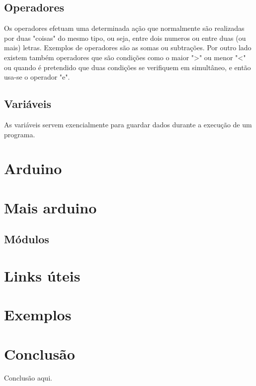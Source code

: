 \documentclass{article}
\begin{document}
\subsection{Operadores}
Os operadores efetuam uma determinada ação que normalmente são realizadas por duas "coisas" do mesmo tipo, ou seja, entre dois numeros ou entre duas (ou mais) letras. Exemplos de operadores são as somas ou subtrações. Por outro lado existem também operadores que são condições como o maior ">" ou menor "<" ou quando é pretendido que duas condições se verifiquem em simultâneo, e então usa-se o operador "e".

\subsection{Variáveis}
As variáveis servem exencialmente para guardar dados durante a execução de um programa.

\section{Arduino}

\section{Mais arduino}

\subsection{Módulos}

\section{Links úteis}

\section{Exemplos}



\section{Conclusão}
Conclusão aqui.
\end{document}
